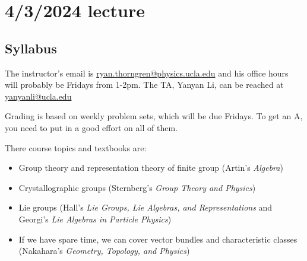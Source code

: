 \documentclass[class=article, crop=false]{standalone}
\begin{document}
\section{4/3/2024 lecture}

\subsection{Syllabus}
The instructor's email is \url{ryan.thorngren@physics.ucla.edu} and his office hours will probably be Fridays from 1-2pm. The TA, Yanyan Li, can be reached at \url{yanyanli@ucla.edu}
\par
Grading is based on weekly problem sets, which will be due Fridays. To get an A, you need to put in a good effort on all of them.
\par
There course topics and textbooks are:
\begin{itemize}
    \item Group theory and representation theory of finite group (Artin's \emph{Algebra})
    \item Crystallographic groups (Sternberg's \emph{Group Theory and Physics})
    \item Lie groups (Hall's \emph{Lie Groups, Lie Algebras, and Representations} and Georgi's \emph{Lie Algebras in Particle Physics})
    \item If we have spare time, we can cover vector bundles and characteristic classes (Nakahara's \emph{Geometry, Topology, and Physics})
\end{itemize}
\end{document}

